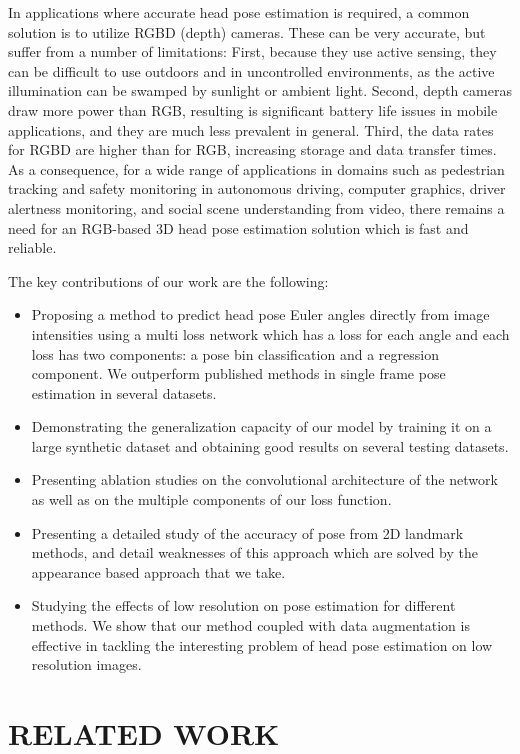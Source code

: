 \documentclass[10pt,twocolumn,letterpaper]{article}
\begin{document}
In applications where accurate head pose estimation is required, a common solution is to utilize RGBD (depth) cameras. These can be very accurate, but suffer from a number of limitations: First, because they use active sensing, they can be difficult to use outdoors and in uncontrolled environments, as the active illumination can be swamped by sunlight or ambient light. Second, depth cameras draw more power than RGB, resulting is significant battery life issues in mobile applications, and they are much less prevalent in general. Third, the data rates for RGBD are higher than for RGB, increasing storage and data transfer times. As a consequence, for a wide range of applications in domains such as pedestrian tracking and safety monitoring in autonomous driving, computer graphics, driver alertness monitoring, and social scene understanding from video, there remains a need for an RGB-based 3D head pose estimation solution which is fast and reliable.

The key contributions of our work are the following:
\begin{itemize}
\itemsep0em 
\item Proposing a method to predict head pose Euler angles directly from image intensities using a multi loss network which has a loss for each angle and each loss has two components: a pose bin classification and a regression component. We outperform published methods in single frame pose estimation in several datasets.
\item Demonstrating the generalization capacity of our model by training it on a large synthetic dataset and obtaining good results on several testing datasets.
\item Presenting ablation studies on the convolutional architecture of the network as well as on the multiple components of our loss function.
\item Presenting a detailed study of the accuracy of pose from 2D landmark methods, and detail weaknesses of this approach which are solved by the appearance based approach that we take.
\item Studying the effects of low resolution on pose estimation for different methods. We show that our method coupled with data augmentation is effective in tackling the interesting problem of head pose estimation on low resolution images.
\end{itemize}


\section{RELATED WORK}\label{sec2}
\end{document}
